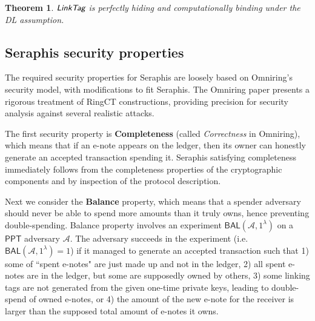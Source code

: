 \documentclass{article}
\theoremstyle{plain}
\newtheorem{theorem}{Theorem}[section]
\theoremstyle{remark}
\begin{document}
\begin{theorem}\label{thm-linktag}
$\emph{\textsf{LinkTag}}$ is perfectly hiding and computationally binding under the DL assumption.
\end{theorem}

\subsection{Seraphis security properties}\label{sec-thm}
The required security properties for Seraphis are loosely based on Omniring's security model, with modifications to fit Seraphis. The Omniring paper presents a rigorous treatment of RingCT constructions, providing precision for security analysis against several realistic attacks.

The first security property is \textbf{Completeness} (called \textit{Correctness} in Omniring), which means that if an e-note appears on the ledger, then its owner can honestly generate an accepted transaction spending it. Seraphis satisfying completeness immediately follows from the completeness properties of the cryptographic components and by inspection of the protocol description.

Next we consider the \textbf{Balance} property, which means that a spender adversary should never be able to spend more amounts than it truly owns, hence preventing double-spending. Balance property involves an experiment $\textsf{BAL}(\mathcal{A}, 1^{\lambda})$  on a $\textsf{PPT}$ adversary $\mathcal{A}$. The adversary succeeds in the experiment (i.e. $\textsf{BAL}(\mathcal{A}, 1^{\lambda})=1$) if it managed to generate an accepted transaction such that
1) some of ``spent e-notes" are just made up and not in the ledger, 2) all spent e-notes are in the ledger, but some are supposedly owned by others, 3) some linking tags are not generated from the given one-time private keys, leading to double-spend of owned e-notes, or 4) the amount of the new e-note for the receiver is larger than the supposed total amount of e-notes it owns.
\end{document}
